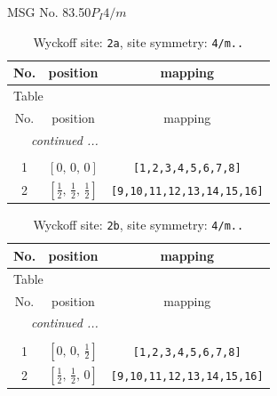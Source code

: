 \documentclass[fleqn,8pt]{jsarticle}
\begin{document}
\setcounter{MaxMatrixCols}{32}

\renewcommand{\tablename}{Table~}
\renewcommand{\figurename}{Figure~}
\begin{center}
\LARGE
MSG No. 83.50\quad$P_{I}4/m$
\end{center}
\renewcommand{\arraystretch}{1.2}
\begin{longtable}{ccc}
\caption{Wyckoff site: {\tt 2a}, site symmetry: {\tt 4/m..}}
 \\
 \hline \hline
No. & position & mapping \\ \hline \endfirsthead

\multicolumn{2}{l}{\tablename\ \thetable{}} \\
 \hline \hline
No. & position & mapping \\ \hline \endhead

 \hline \hline
\multicolumn{2}{r}{\footnotesize\it continued ...} \\ \endfoot

 \hline \hline
\multicolumn{2}{r}{} \\ \endlastfoot

1 & $\left[ 0,\, 0,\, 0 \right]$ & {\tt [1,2,3,4,5,6,7,8]} \\ \hline
2 & $\left[ \frac{1}{2},\, \frac{1}{2},\, \frac{1}{2} \right]$ & {\tt [9,10,11,12,13,14,15,16]} \\
\end{longtable}
\renewcommand{\arraystretch}{1.2}
\begin{longtable}{ccc}
\caption{Wyckoff site: {\tt 2b}, site symmetry: {\tt 4/m..}}
 \\
 \hline \hline
No. & position & mapping \\ \hline \endfirsthead

\multicolumn{2}{l}{\tablename\ \thetable{}} \\
 \hline \hline
No. & position & mapping \\ \hline \endhead

 \hline \hline
\multicolumn{2}{r}{\footnotesize\it continued ...} \\ \endfoot

 \hline \hline
\multicolumn{2}{r}{} \\ \endlastfoot

1 & $\left[ 0,\, 0,\, \frac{1}{2} \right]$ & {\tt [1,2,3,4,5,6,7,8]} \\ \hline
2 & $\left[ \frac{1}{2},\, \frac{1}{2},\, 0 \right]$ & {\tt [9,10,11,12,13,14,15,16]} \\
\end{longtable}
\end{document}
